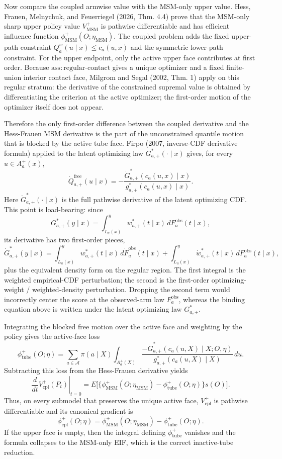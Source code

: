 \documentclass{article}
\begin{document}
Now compare the coupled armwise value with the MSM-only upper value. Hess, Frauen, Melnychuk, and Feuerriegel (2026, Thm. 4.4) prove that the MSM-only sharp upper policy value \(V_{\mathrm{MSM}}^+\) is pathwise differentiable and has efficient influence function \(\phi_{\mathrm{MSM}}^+(O;\eta_{\mathrm{MSM}})\). The coupled problem adds the fixed upper-path constraint \(Q_a^w(u\mid x)\le c_a(u,x)\) and the symmetric lower-path constraint. For the upper endpoint, only the active upper face contributes at first order. Because \(\mathrm{ass\!:\!regular\mbox{-}contact}\) gives a unique optimizer and a fixed finite-union interior contact face, Milgrom and Segal (2002, Thm. 1) apply on this regular stratum: the derivative of the constrained supremal value is obtained by differentiating the criterion at the active optimizer; the first-order motion of the optimizer itself does not appear.

Therefore the only first-order difference between the coupled derivative and the Hess-Frauen MSM derivative is the part of the unconstrained quantile motion that is blocked by the active tube face. Firpo (2007, inverse-CDF derivative formula) applied to the latent optimizing law \(G_{a,+}^*(\cdot\mid x)\) gives, for every \(u\in A_a^+(x)\),
\[
\dot Q_{a,+}^{\mathrm{free}}(u\mid x)
= -\frac{\dot G_{a,+}^*(c_a(u,x)\mid x)}{g_{a,+}^*(c_a(u,x)\mid x)}.
\]
Here \(\dot G_{a,+}^*(\cdot\mid x)\) is the full pathwise derivative of the latent optimizing CDF. This point is load-bearing: since
\[
G_{a,+}^*(y\mid x)=\int_{L_a(x)}^y w_{a,+}^*(t\mid x)\,dF_a^{\mathrm{obs}}(t\mid x),
\]
its derivative has two first-order pieces,
\[
\dot G_{a,+}^*(y\mid x)
= \int_{L_a(x)}^y w_{a,+}^*(t\mid x)\,d\dot F_a^{\mathrm{obs}}(t\mid x)
  + \int_{L_a(x)}^y \dot w_{a,+}^*(t\mid x)\,dF_a^{\mathrm{obs}}(t\mid x),
\]
plus the equivalent density form on the regular region. The first integral is the weighted empirical-CDF perturbation; the second is the first-order optimizing-weight / weighted-density perturbation. Dropping the second term would incorrectly center the score at the observed-arm law \(F_a^{\mathrm{obs}}\), whereas the binding equation above is written under the latent optimizing law \(G_{a,+}^*\).

Integrating the blocked free motion over the active face and weighting by the policy gives the active-face loss
\[
\phi_{\mathrm{tube}}^+(O;\eta)
= \sum_{a\in\mathcal A}\pi(a\mid X)
   \int_{A_a^+(X)}\frac{-\dot G_{a,+}^*(c_a(u,X)\mid X;O,\eta)}{g_{a,+}^*(c_a(u,X)\mid X)}\,du.
\]
Subtracting this loss from the Hess-Frauen derivative yields
\[
\left.\frac{d}{dt}V_{\mathrm{cpl}}^+(P_t)\right|_{t=0}
=E\Big[\big\{\phi_{\mathrm{MSM}}^+(O;\eta_{\mathrm{MSM}})-\phi_{\mathrm{tube}}^+(O;\eta)\big\}s(O)\Big].
\]
Thus, on every submodel that preserves the unique active face, \(V_{\mathrm{cpl}}^+\) is pathwise differentiable and its canonical gradient is
\[
\phi_{\mathrm{cpl}}^+(O;\eta)=\phi_{\mathrm{MSM}}^+(O;\eta_{\mathrm{MSM}})-\phi_{\mathrm{tube}}^+(O;\eta).
\]
If the upper face is empty, then the integral defining \(\phi_{\mathrm{tube}}^+\) vanishes and the formula collapses to the MSM-only EIF, which is the correct inactive-tube reduction.
\end{document}
